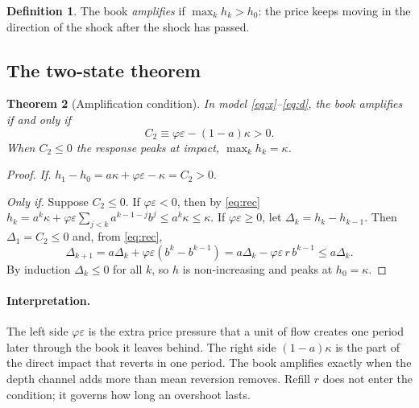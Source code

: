 \documentclass[12pt]{article}
\newtheorem{theorem}{Theorem}[section]
\theoremstyle{definition}
\newtheorem{definition}[theorem]{Definition}
\theoremstyle{remark}
\begin{document}
\begin{definition}
The book \emph{amplifies} if $\max_kh_k>h_0$: the price keeps moving in the direction of the shock after the shock has passed.
\end{definition}

\subsection{The two-state theorem}

\begin{theorem}[Amplification condition]\label{thm:t6}
In model \eqref{eq:x}--\eqref{eq:d}, the book amplifies if and only if
\[
C_2\equiv\varphi\varepsilon-(1-a)\kappa>0 .
\]
When $C_2\le0$ the response peaks at impact, $\max_kh_k=\kappa$.
\end{theorem}

\begin{proof}
\emph{If.} $h_1-h_0=a\kappa+\varphi\varepsilon-\kappa=C_2>0$.

\emph{Only if.} Suppose $C_2\le0$. If $\varphi\varepsilon<0$, then by \eqref{eq:rec} $h_k=a^k\kappa+\varphi\varepsilon\sum_{j<k}a^{k-1-j}b^j\le a^k\kappa\le\kappa$. If $\varphi\varepsilon\ge0$, let $\Delta_k=h_k-h_{k-1}$. Then $\Delta_1=C_2\le0$ and, from \eqref{eq:rec},
\[
\Delta_{k+1}=a\Delta_k+\varphi\varepsilon(b^{k}-b^{k-1})=a\Delta_k-\varphi\varepsilon\,r\,b^{k-1}\le a\Delta_k .
\]
By induction $\Delta_k\le0$ for all $k$, so $h$ is non-increasing and peaks at $h_0=\kappa$.
\end{proof}

\paragraph{Interpretation.} The left side $\varphi\varepsilon$ is the extra price pressure that a unit of flow creates one period later through the book it leaves behind. The right side $(1-a)\kappa$ is the part of the direct impact that reverts in one period. The book amplifies exactly when the depth channel adds more than mean reversion removes. Refill $r$ does not enter the condition; it governs how long an overshoot lasts.
\end{document}
